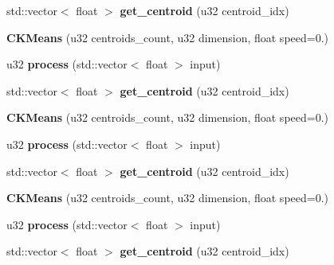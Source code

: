 \begin{DoxyCompactItemize}
\item 
\hypertarget{classCKMeans_aad8e04e240531802800a962c87b9463b}{std\-::vector$<$ float $>$ {\bfseries get\-\_\-centroid} (u32 centroid\-\_\-idx)}\label{classCKMeans_aad8e04e240531802800a962c87b9463b}

\item 
\hypertarget{classCKMeans_a8901727f51a1cbb649a01e7a05b5a296}{{\bfseries C\-K\-Means} (u32 centroids\-\_\-count, u32 dimension, float speed=0.)}\label{classCKMeans_a8901727f51a1cbb649a01e7a05b5a296}

\item 
\hypertarget{classCKMeans_a0f1386295c73bd9643caeb5afd712d40}{u32 {\bfseries process} (std\-::vector$<$ float $>$ input)}\label{classCKMeans_a0f1386295c73bd9643caeb5afd712d40}

\item 
\hypertarget{classCKMeans_aad8e04e240531802800a962c87b9463b}{std\-::vector$<$ float $>$ {\bfseries get\-\_\-centroid} (u32 centroid\-\_\-idx)}\label{classCKMeans_aad8e04e240531802800a962c87b9463b}

\item 
\hypertarget{classCKMeans_a8901727f51a1cbb649a01e7a05b5a296}{{\bfseries C\-K\-Means} (u32 centroids\-\_\-count, u32 dimension, float speed=0.)}\label{classCKMeans_a8901727f51a1cbb649a01e7a05b5a296}

\item 
\hypertarget{classCKMeans_a0f1386295c73bd9643caeb5afd712d40}{u32 {\bfseries process} (std\-::vector$<$ float $>$ input)}\label{classCKMeans_a0f1386295c73bd9643caeb5afd712d40}

\item 
\hypertarget{classCKMeans_aad8e04e240531802800a962c87b9463b}{std\-::vector$<$ float $>$ {\bfseries get\-\_\-centroid} (u32 centroid\-\_\-idx)}\label{classCKMeans_aad8e04e240531802800a962c87b9463b}

\item 
\hypertarget{classCKMeans_a8901727f51a1cbb649a01e7a05b5a296}{{\bfseries C\-K\-Means} (u32 centroids\-\_\-count, u32 dimension, float speed=0.)}\label{classCKMeans_a8901727f51a1cbb649a01e7a05b5a296}

\item 
\hypertarget{classCKMeans_a0f1386295c73bd9643caeb5afd712d40}{u32 {\bfseries process} (std\-::vector$<$ float $>$ input)}\label{classCKMeans_a0f1386295c73bd9643caeb5afd712d40}

\item 
\hypertarget{classCKMeans_aad8e04e240531802800a962c87b9463b}{std\-::vector$<$ float $>$ {\bfseries get\-\_\-centroid} (u32 centroid\-\_\-idx)}\label{classCKMeans_aad8e04e240531802800a962c87b9463b}

\end{DoxyCompactItemize}


